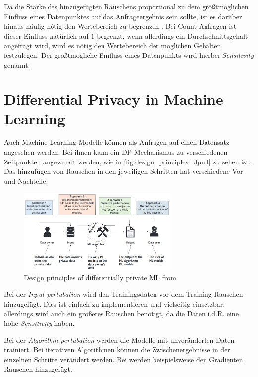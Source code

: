 Da die Stärke des hinzugefügten Rauschens proportional zu dem größtmöglichen Einfluss eines Datenpunktes auf das Anfrageergebnis sein sollte, ist es darüber hinaus häufig nötig den Wertebereich zu begrenzen \parencite[p.31]{chang:2023}. Bei Count-Anfragen ist dieser Einfluss natürlich auf $1$ begrenzt, wenn allerdings ein Durchschnittsgehalt angefragt wird, wird es nötig den Wertebereich der möglichen Gehälter festzulegen. Der größtmögliche Einfluss eines Datenpunkts wird hierbei \textit{Sensitivity} genannt.

\section{Differential Privacy in Machine Learning}

Auch Machine Learning Modelle können als Anfragen auf einen Datensatz angesehen werden. Bei ihnen kann ein DP-Mechanismus zu verschiedenen Zeitpunkten angewandt werden, wie in \autoref{fig:design_principles_dpml} zu sehen ist. Das hinzufügen von Rauschen in den jeweiligen Schritten hat verschiedene Vor- und Nachteile.

\begin{figure}[tb]
  \centering
  \includegraphics[width=0.7\textwidth]{Bilder/design_principles_dpml.png}
  \caption{Design principles of differentially private ML from \textcite{chang:2023}}
  \label{fig:design_principles_dpml}
\end{figure}

Bei der \textit{Input pertubation} wird den Trainingsdaten vor dem Training Rauschen hinzugefügt. Dies ist einfach zu implementieren und vielseitig einsetzbar, allerdings wird auch ein größeres Rauschen benötigt, da die Daten i.d.R. eine hohe \textit{Sensitivity} haben.

Bei der \textit{Algorithm pertubation} werden die Modelle mit unveränderten Daten trainiert. Bei iterativen Algorithmen können die Zwischenergebnisse in der einzelnen Schritte verändert werden. Bei \textcite{abadi:2016} werden beispielsweise den Gradienten Rauschen hinzugefügt.

